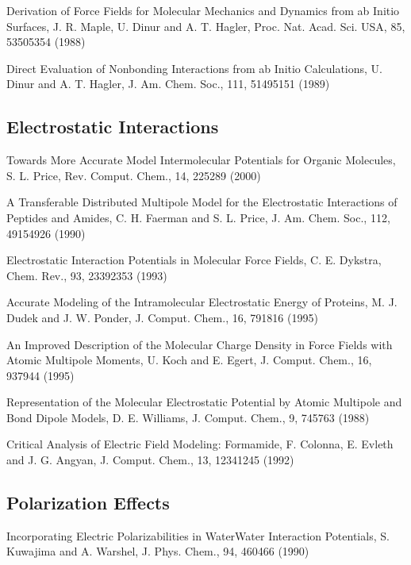 \documentclass[letterpaper,11pt,english]{sphinxmanual}
\begin{document}
\sphinxAtStartPar
Derivation of Force Fields for Molecular Mechanics and Dynamics from ab Initio Surfaces, J. R. Maple, U. Dinur and A. T. Hagler, Proc. Nat. Acad. Sci. USA, 85, 5350\sphinxhyphen{}5354 (1988)

\sphinxAtStartPar
Direct Evaluation of Nonbonding Interactions from ab Initio Calculations, U. Dinur and A. T. Hagler, J. Am. Chem. Soc., 111, 5149\sphinxhyphen{}5151 (1989)


\subsection{Electrostatic Interactions}
\label{\detokenize{text/references:electrostatic-interactions}}
\sphinxAtStartPar
Towards More Accurate Model Intermolecular Potentials for Organic Molecules, S. L. Price, Rev. Comput. Chem., 14, 225\sphinxhyphen{}289 (2000)

\sphinxAtStartPar
A Transferable Distributed Multipole Model for the Electrostatic Interactions of Peptides and Amides, C. H. Faerman and S. L. Price, J. Am. Chem. Soc., 112, 4915\sphinxhyphen{}4926 (1990)

\sphinxAtStartPar
Electrostatic Interaction Potentials in Molecular Force Fields, C. E. Dykstra, Chem. Rev., 93, 2339\sphinxhyphen{}2353 (1993)

\sphinxAtStartPar
Accurate Modeling of the Intramolecular Electrostatic Energy of Proteins, M. J. Dudek and J. W. Ponder, J. Comput. Chem., 16, 791\sphinxhyphen{}816 (1995)

\sphinxAtStartPar
An Improved Description of the Molecular Charge Density in Force Fields with Atomic Multipole Moments, U. Koch and E. Egert, J. Comput. Chem., 16, 937\sphinxhyphen{}944 (1995)

\sphinxAtStartPar
Representation of the Molecular Electrostatic Potential by Atomic Multipole and Bond Dipole Models, D. E. Williams, J. Comput. Chem., 9, 745\sphinxhyphen{}763 (1988)

\sphinxAtStartPar
Critical Analysis of Electric Field Modeling: Formamide, F. Colonna, E. Evleth and J. G. Angyan, J. Comput. Chem., 13, 1234\sphinxhyphen{}1245 (1992)


\subsection{Polarization Effects}
\label{\detokenize{text/references:polarization-effects}}
\sphinxAtStartPar
Incorporating Electric Polarizabilities in Water\sphinxhyphen{}Water Interaction Potentials, S. Kuwajima and A. Warshel, J. Phys. Chem., 94, 460\sphinxhyphen{}466 (1990)
\end{document}
